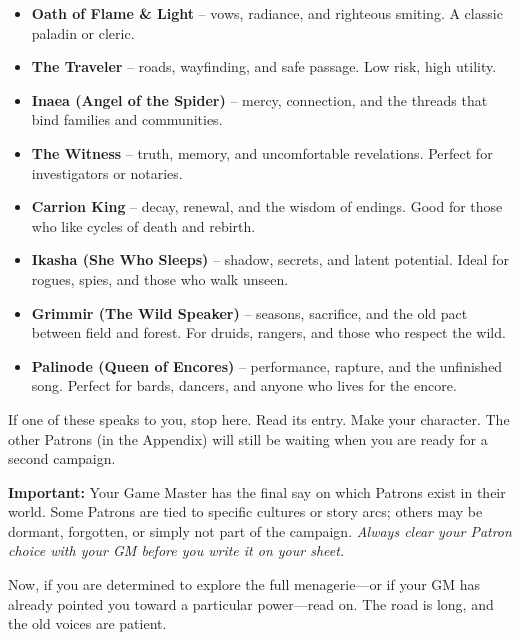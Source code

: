 \begin{itemize}
  \item \textbf{Oath of Flame \& Light} -- vows, radiance, and righteous smiting. A classic paladin or cleric.
  \item \textbf{The Traveler} -- roads, wayfinding, and safe passage. Low risk, high utility.
  \item \textbf{Inaea (Angel of the Spider)} -- mercy, connection, and the threads that bind families and communities.
  \item \textbf{The Witness} -- truth, memory, and uncomfortable revelations. Perfect for investigators or notaries.
  \item \textbf{Carrion King} -- decay, renewal, and the wisdom of endings. Good for those who like cycles of death and rebirth.
  \item \textbf{Ikasha (She Who Sleeps)} -- shadow, secrets, and latent potential. Ideal for rogues, spies, and those who walk unseen.
  \item \textbf{Grimmir (The Wild Speaker)} -- seasons, sacrifice, and the old pact between field and forest. For druids, rangers, and those who respect the wild.
  \item \textbf{Palinode (Queen of Encores)} -- performance, rapture, and the unfinished song. Perfect for bards, dancers, and anyone who lives for the encore.
\end{itemize}

\medskip
If one of these speaks to you, stop here. Read its entry. Make your character. The other Patrons (in the Appendix) will still be waiting when you are ready for a second campaign.

\medskip
\noindent\textbf{Important:} Your Game Master has the final say on which Patrons exist in their world. Some Patrons are tied to specific cultures or story arcs; others may be dormant, forgotten, or simply not part of the campaign. \textit{Always clear your Patron choice with your GM before you write it on your sheet.}

\medskip
Now, if you are determined to explore the full menagerie---or if your GM has already pointed you toward a particular power---read on. The road is long, and the old voices are patient.

\clearpage

\clearpage

\clearpage

\clearpage

\clearpage

\clearpage

\clearpage

\clearpage

\clearpage

